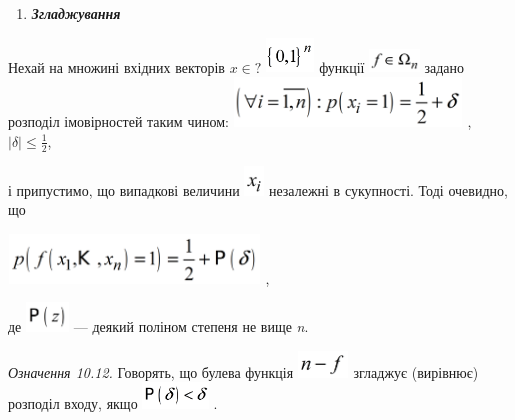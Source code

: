 \liststyleWWviiiNumxxix
\setcounter{saveenum}{\value{enumi}}
\begin{enumerate}
\setcounter{enumi}{\value{saveenum}}
\item {\bfseries\itshape
Згладжування}
\end{enumerate}
Нехай на множині  вхідних векторів  $x\in ?$
\includegraphics[width=0.5047in,height=0.3638in]{crypt-img/crypt-img238.png} 
функції 
\includegraphics[width=0.528in,height=0.25in]{crypt-img/crypt-img239.png} 
задано розподіл імовірностей таким чином: 
\includegraphics[width=2.389in,height=0.522in]{crypt-img/crypt-img240.png} , 
$|\delta |\le \frac{1}2$,

і припустимо, що випадкові величини 
\includegraphics[width=0.2083in,height=0.3134in]{crypt-img/crypt-img241.png} 
незалежні в сукупності. Тоді очевидно, що

{\centering
 \includegraphics[width=2.6339in,height=0.5193in]{crypt-img/crypt-img242.png} ,
\par}

де  \includegraphics[width=0.4492in,height=0.311in]{crypt-img/crypt-img243.png} 
--- деякий поліном степеня не вище \textit{n}.

 \textit{Означення 10.12.}\textit{ }Говорять, що булева функція 
\includegraphics[width=0.5319in,height=0.2791in]{crypt-img/crypt-img244.png} 
згладжує (вирівнює) розподіл входу, якщо 
\includegraphics[width=0.6937in,height=0.278in]{crypt-img/crypt-img245.png} .

